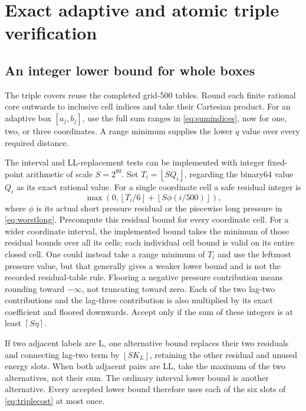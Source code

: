 \documentclass[11pt]{amsart}
\numberwithin{equation}{section}
\newcommand{\floor}[1]{\left\lfloor #1\right\rfloor}
\newcommand{\ceil}[1]{\left\lceil #1\right\rceil}
\begin{document}
\section{Exact adaptive and atomic triple verification}

\subsection{An integer lower bound for whole boxes}

The triple covers reuse the completed grid-500 tables. Round each
finite rational core outwards to inclusive cell indices and take
their Cartesian product. For an adaptive box $[a_j,b_j]$, use the
full sum ranges in \eqref{eq:sumindices}, now for one, two, or
three coordinates. A range minimum supplies the lower $q$ value
over every required distance.

The interval and LL-replacement tests can be implemented with integer
fixed-point arithmetic of scale $S=2^{80}$. Set
$T_i=\floor{S Q_i}$, regarding the binary64 value $Q_i$ as its
exact rational value. For a single coordinate cell a safe residual
integer is
\begin{equation}\label{eq:fixedresidual}
 \max\left(0,\floor{T_i/6}
                    +\floor{S\phi(i/500)}\right),
\end{equation}
where $\phi$ is its actual short pressure residual or the
piecewise long pressure in \eqref{eq:worstlong}. Precompute this
residual bound for every coordinate cell. For a wider coordinate
interval, the implemented bound takes the minimum of those residual
bounds over all its cells; each individual cell bound is valid on
its entire closed cell. One could instead take a range minimum of
$T_i$ and use the leftmost pressure value, but that generally gives
a weaker lower bound and is not the recorded residual-table rule.
Flooring a negative pressure contribution means rounding toward
$-\infty$, not truncating toward zero. Each of the two lag-two
contributions and the lag-three contribution is also multiplied by
its exact coefficient and floored downwards. Accept only if the
sum of these integers is at least $\ceil{S\eta}$.

If two adjacent labels are L, one alternative bound replaces their
two residuals and connecting lag-two term by
$\floor{S K_L}$, retaining the other residual and unused energy
slots. When both adjacent pairs are LL, take the maximum of the
two alternatives, not their sum. The ordinary interval lower bound
is another alternative. Every accepted lower bound therefore uses
each of the six slots of \eqref{eq:triplecost} at most once.
\end{document}
